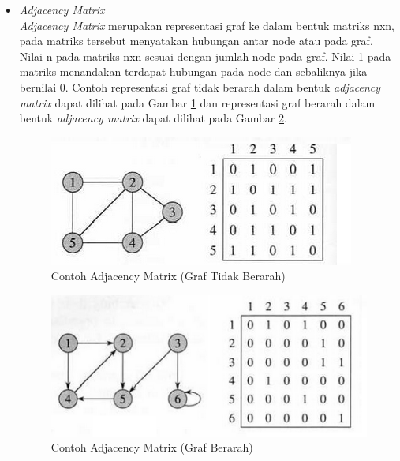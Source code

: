 \begin{itemize}
  \item \textit{Adjacency Matrix}\\
  \textit{Adjacency Matrix} merupakan representasi graf ke dalam bentuk matriks
  nxn, pada matriks tersebut menyatakan hubungan antar node atau pada graf.
  Nilai n pada matriks nxn sesuai dengan jumlah node pada graf. Nilai 1 pada
  matriks menandakan terdapat hubungan pada node dan sebaliknya jika bernilai
  0. Contoh representasi graf tidak berarah dalam bentuk \textit{adjacency
  matrix} dapat dilihat pada Gambar \ref{fig:adjmat_undirec} dan representasi
  graf berarah dalam bentuk \textit{adjacency matrix} dapat dilihat pada Gambar
  \ref{fig:adjmat_direc}.
  
\begin{figure}[h]
\centering
\includegraphics[scale=0.9]{Gambar/adjmat_undirec}
\caption[Contoh Adjacency Matrix]{Contoh Adjacency Matrix (Graf Tidak Berarah)}
\label{fig:adjmat_undirec}
\end{figure}

\begin{figure}[h]
\centering
\includegraphics[scale=0.9]{Gambar/adjmat_direc}
\caption[Contoh Adjacency Matrix]{Contoh Adjacency Matrix (Graf Berarah)}
\label{fig:adjmat_direc}
\end{figure}
\end{itemize}

